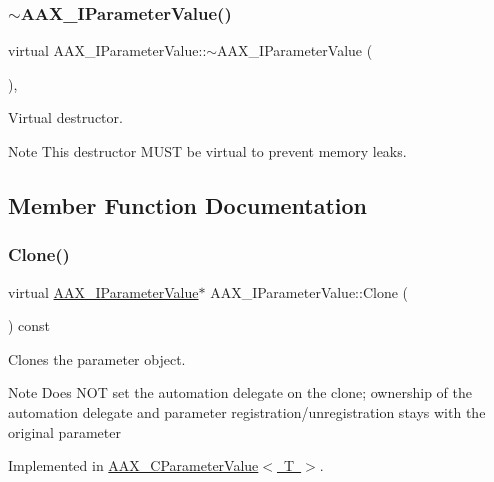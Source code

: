 \subsubsection{\texorpdfstring{$\sim$AAX\_IParameterValue()}{~AAX\_IParameterValue()}}
{\footnotesize\ttfamily virtual A\+A\+X\+\_\+\+I\+Parameter\+Value\+::$\sim$\+A\+A\+X\+\_\+\+I\+Parameter\+Value (\begin{DoxyParamCaption}{ }\end{DoxyParamCaption})\hspace{0.3cm}{\ttfamily [inline]}, {\ttfamily [virtual]}}



Virtual destructor. 

\begin{DoxyNote}{Note}
This destructor M\+U\+ST be virtual to prevent memory leaks. 
\end{DoxyNote}


\subsection{Member Function Documentation}
\mbox{\label{a01853_a23ebf3322f5ded89954a5e220d2e717f}} 
\subsubsection{\texorpdfstring{Clone()}{Clone()}}
{\footnotesize\ttfamily virtual \mbox{\hyperlink{a01853}{A\+A\+X\+\_\+\+I\+Parameter\+Value}}$\ast$ A\+A\+X\+\_\+\+I\+Parameter\+Value\+::\+Clone (\begin{DoxyParamCaption}{ }\end{DoxyParamCaption}) const\hspace{0.3cm}{\ttfamily [pure virtual]}}



Clones the parameter object. 

\begin{DoxyNote}{Note}
Does N\+OT set the automation delegate on the clone; ownership of the automation delegate and parameter registration/unregistration stays with the original parameter 
\end{DoxyNote}


Implemented in \mbox{\hyperlink{a01533_a6618ae2833e64a3b75752cdbb02d6332}{A\+A\+X\+\_\+\+C\+Parameter\+Value$<$ T $>$}}.

